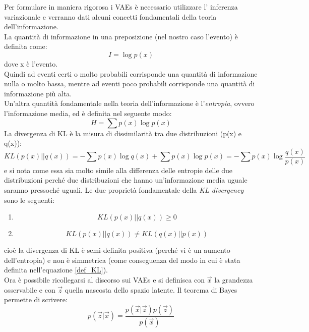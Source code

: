 Per formulare in maniera rigorosa i VAEs è necessario utilizzare l' inferenza variazionale e verranno dati alcuni concetti fondamentali della teoria dell'informazione. \\
La quantità di informazione in una preposizione (nel nostro caso l'evento) è definita come:
\begin{equation}
	I = \log p(x)
\end{equation}
dove x è l'evento. \\
Quindi ad eventi certi o molto probabili corrisponde una quantità di informazione nulla o molto bassa, mentre ad eventi poco probabili corrisponde una quantità di informazione più alta. \\ 
Un'altra quantità fondamentale nella teoria dell'informazione è l'\textit{entropia}, ovvero l'informazione media, ed è definita nel seguente modo:
\begin{equation}
	H = \sum p(x) \log p(x)
\end{equation}
La divergenza di KL è la misura di dissimilarità tra due distribuzioni (p(x) e q(x)):
\begin{equation}
	KL(p(x)||q(x)) = -\sum p(x) \log q(x) + \sum p(x) \log p(x) = -\sum p(x) \log \frac{q(x)}{p(x)}
	\label{def_KL}
\end{equation}
e si nota come essa sia molto simile alla differenza delle entropie delle due distribuzioni perché due distribuzioni che hanno un'informazione media uguale saranno pressoché uguali.
Le due proprietà fondamentale della \textit{KL divergency} sono le seguenti:
\begin{enumerate}
	\item 
	\begin{equation}
		KL(p(x)||q(x)) \geq 0
	\end{equation}
	
	\item 
	\begin{equation}
		KL(p(x)||q(x)) \not = KL(q(x)||p(x))
	\end{equation}
\end{enumerate}
cioè la divergenza di KL è semi-definita positiva (perché vi è un aumento dell'entropia) e non è simmetrica (come conseguenza del modo in cui è stata definita nell'equazione \ref{def_KL}). \\
Ora è possibile ricollegarsi al discorso sui VAEs e si definisca con $\vec{x}$ la grandezza osservabile e con $\vec{z}$ quella nascosta dello spazio latente. Il teorema di Bayes \cite{Statistica} permette di scrivere:
\begin{equation}
	p(\vec{z}|\vec{x}) = \frac{p(\vec{x}|\vec{z}) p(\vec{z})}{p(\vec{x})}
	\label{bayes}
\end{equation}
